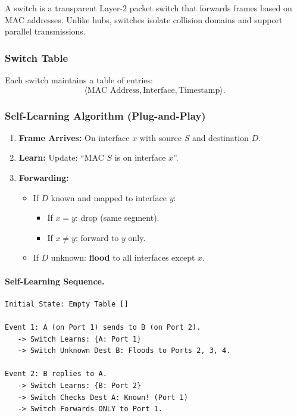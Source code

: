 \documentclass[12pt]{article}
\begin{document}
A switch is a transparent Layer-2 packet switch that forwards frames based on MAC addresses.
Unlike hubs, switches isolate collision domains and support parallel transmissions.

\subsubsection{Switch Table}

Each switch maintains a table of entries:
\[
    \langle \text{MAC Address}, \text{Interface}, \text{Timestamp} \rangle.
\]

\subsubsection{Self-Learning Algorithm (Plug-and-Play)}

\begin{enumerate}
    \item \textbf{Frame Arrives:} On interface $x$ with source $S$ and destination $D$.
    \item \textbf{Learn:} Update: “MAC $S$ is on interface $x$”.
    \item \textbf{Forwarding:}
          \begin{itemize}
              \item If $D$ known and mapped to interface $y$:
                    \begin{itemize}
                        \item If $x = y$: drop (same segment).
                        \item If $x \neq y$: forward to $y$ only.
                    \end{itemize}
              \item If $D$ unknown: \textbf{flood} to all interfaces except $x$.
          \end{itemize}
\end{enumerate}

\paragraph{Self-Learning Sequence.}

\begin{verbatim}
Initial State: Empty Table []

Event 1: A (on Port 1) sends to B (on Port 2).
   -> Switch Learns: {A: Port 1}
   -> Switch Unknown Dest B: Floods to Ports 2, 3, 4.

Event 2: B replies to A.
   -> Switch Learns: {B: Port 2}
   -> Switch Checks Dest A: Known! (Port 1)
   -> Switch Forwards ONLY to Port 1.
\end{verbatim}
\end{document}
